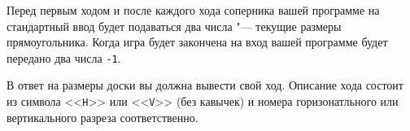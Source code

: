 Перед первым ходом и после каждого хода соперника вашей программе на стандартный
ввод будет подаваться два числа "--- текущие размеры прямоугольника.
Когда игра будет закончена на вход вашей программе будет передано два числа \texttt{-1}.

В ответ на размеры доски вы должна вывести свой ход. 
Описание хода состоит из символа <<\texttt{H}>> или <<\texttt{V}>> (без кавычек)
и номера горизонатльного или вертикального разреза соответственно.
